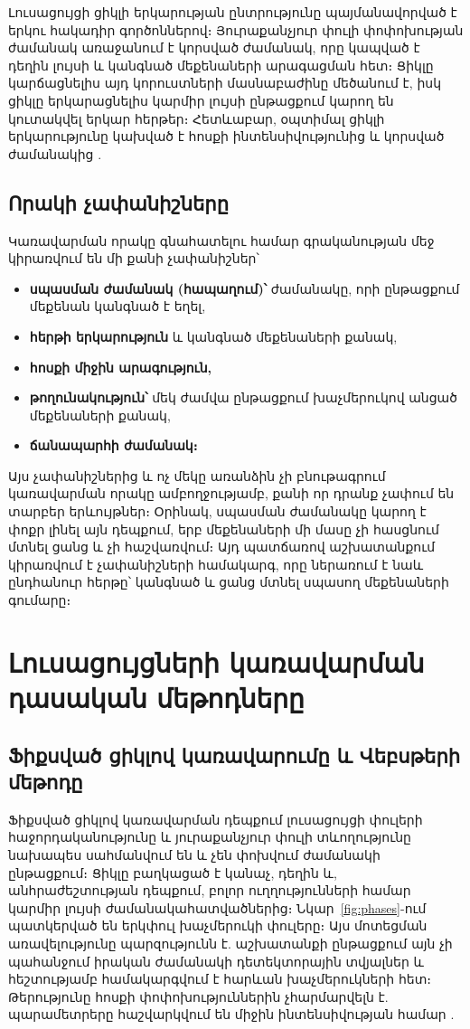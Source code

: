 \documentclass[12pt,a4paper]{extreport}
\begin{document}
Լուսացույցի ցիկլի երկարության ընտրությունը պայմանավորված է երկու հակադիր գործոններով։ Յուրաքանչյուր փուլի փոփոխության ժամանակ առաջանում է կորսված ժամանակ, որը կապված է դեղին լույսի և կանգնած մեքենաների արագացման հետ։ Ցիկլը կարճացնելիս այդ կորուստների մասնաբաժինը մեծանում է, իսկ ցիկլը երկարացնելիս կարմիր լույսի ընթացքում կարող են կուտակվել երկար հերթեր։ Հետևաբար, օպտիմալ ցիկլի երկարությունը կախված է հոսքի ինտենսիվությունից և կորսված ժամանակից \cite{webster1958}.

\subsection{Որակի չափանիշները}

Կառավարման որակը գնահատելու համար գրականության մեջ կիրառվում են մի քանի չափանիշներ՝

\begin{itemize}
  \item \textbf{սպասման ժամանակ (հապաղում)՝} ժամանակը, որի ընթացքում մեքենան կանգնած է եղել,
  \item \textbf{հերթի երկարություն} և կանգնած մեքենաների քանակ,
  \item \textbf{հոսքի միջին արագություն,}
  \item \textbf{թողունակություն՝} մեկ ժամվա ընթացքում խաչմերուկով անցած մեքենաների քանակ,
  \item \textbf{ճանապարհի ժամանակ։}
\end{itemize}

Այս չափանիշներից և ոչ մեկը առանձին չի բնութագրում կառավարման որակը ամբողջությամբ, քանի որ դրանք չափում են տարբեր երևույթներ։ Օրինակ, սպասման ժամանակը կարող է փոքր լինել այն դեպքում, երբ մեքենաների մի մասը չի հասցնում մտնել ցանց և չի հաշվառվում։ Այդ պատճառով աշխատանքում կիրառվում է չափանիշների համակարգ, որը ներառում է նաև ընդհանուր հերթը՝ կանգնած և ցանց մտնել սպասող մեքենաների գումարը։

\section{Լուսացույցների կառավարման դասական մեթոդները}

\subsection{Ֆիքսված ցիկլով կառավարումը և Վեբսթերի մեթոդը}

Ֆիքսված ցիկլով կառավարման դեպքում լուսացույցի փուլերի հաջորդականությունը և յուրաքանչյուր փուլի տևողությունը նախապես սահմանվում են և չեն փոխվում ժամանակի ընթացքում։ Ցիկլը բաղկացած է կանաչ, դեղին և, անհրաժեշտության դեպքում, բոլոր ուղղությունների համար կարմիր լույսի ժամանակահատվածներից։ Նկար~\ref{fig:phases}-ում պատկերված են երկփուլ խաչմերուկի փուլերը։ Այս մոտեցման առավելությունը պարզությունն է. աշխատանքի ընթացքում այն չի պահանջում իրական ժամանակի դետեկտորային տվյալներ և հեշտությամբ համակարգվում է հարևան խաչմերուկների հետ։ Թերությունը հոսքի փոփոխություններին չհարմարվելն է. պարամետրերը հաշվարկվում են միջին ինտենսիվության համար \cite{webster1958}.
\end{document}
